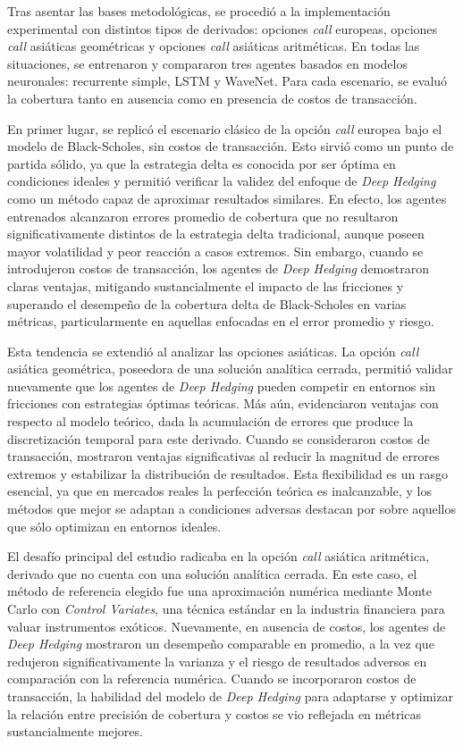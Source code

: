 \documentclass[11pt,a4paper,spanish]{article}
\numberwithin{equation}{section} %
\begin{document}
Tras asentar las bases metodológicas, se procedió a la implementación experimental con distintos tipos de derivados: opciones \textit{call} europeas, opciones \textit{call} asiáticas geométricas y opciones \textit{call} asiáticas aritméticas. En todas las situaciones, se entrenaron y compararon tres agentes basados en modelos neuronales: recurrente simple, LSTM y WaveNet. Para cada escenario, se evaluó la cobertura tanto en ausencia como en presencia de costos de transacción.

En primer lugar, se replicó el escenario clásico de la opción \textit{call} europea bajo el modelo de Black-Scholes, sin costos de transacción. Esto sirvió como un punto de partida sólido, ya que la estrategia delta es conocida por ser óptima en condiciones ideales y permitió verificar la validez del enfoque de \textit{Deep Hedging} como un método capaz de aproximar resultados similares. En efecto, los agentes entrenados alcanzaron errores promedio de cobertura que no resultaron significativamente distintos de la estrategia delta tradicional, aunque poseen mayor volatilidad y peor reacción a casos extremos. Sin embargo, cuando se introdujeron costos de transacción, los agentes de \textit{Deep Hedging} demostraron claras ventajas, mitigando sustancialmente el impacto de las fricciones y superando el desempeño de la cobertura delta de Black-Scholes en varias métricas, particularmente en aquellas enfocadas en el error promedio y riesgo.

Esta tendencia se extendió al analizar las opciones asiáticas. La opción \textit{call} asiática geométrica, poseedora de una solución analítica cerrada, permitió validar nuevamente que los agentes de \textit{Deep Hedging} pueden competir en entornos sin fricciones con estrategias óptimas teóricas. Más aún, evidenciaron ventajas con respecto al modelo teórico, dada la acumulación de errores que produce la discretización temporal para este derivado. Cuando se consideraron costos de transacción, mostraron ventajas significativas al reducir la magnitud de errores extremos y estabilizar la distribución de resultados. Esta flexibilidad es un rasgo esencial, ya que en mercados reales la perfección teórica es inalcanzable, y los métodos que mejor se adaptan a condiciones adversas destacan por sobre aquellos que sólo optimizan en entornos ideales.

El desafío principal del estudio radicaba en la opción \textit{call} asiática aritmética, derivado que no cuenta con una solución analítica cerrada. En este caso, el método de referencia elegido fue una aproximación numérica mediante Monte Carlo con \textit{Control Variates}, una técnica estándar en la industria financiera para valuar instrumentos exóticos. Nuevamente, en ausencia de costos, los agentes de \textit{Deep Hedging} mostraron un desempeño comparable en promedio, a la vez que redujeron significativamente la varianza y el riesgo de resultados adversos en comparación con la referencia numérica. Cuando se incorporaron costos de transacción, la habilidad del modelo de \textit{Deep Hedging} para adaptarse y optimizar la relación entre precisión de cobertura y costos se vio reflejada en métricas sustancialmente mejores.
\end{document}
